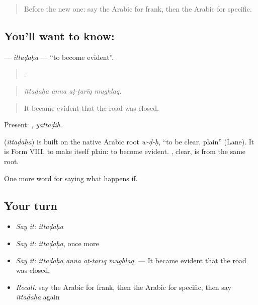 \label{lesson:AR-C417-ittadaha}



\begin{quote}
Before the new one: say the Arabic for frank, then the Arabic for specific.
\end{quote}

\subsection*{You'll want to know: }
\textbf{} — \emph{ittaḍaḥa} — \textquotedblleft{}to become evident\textquotedblright{}.

\begin{quote}
   .
\end{quote}

\begin{quote}
\emph{ittaḍaḥa anna aṭ-ṭarīq mughlaq.}
\end{quote}

\begin{quote}
It became evident that the road was closed.
\end{quote}

Present: , \emph{yattaḍiḥ}.

\begin{cousinweb}
\textbf{} (\emph{ittaḍaḥa}) is built on the native Arabic root \emph{w-ḍ-ḥ}, \textquotedblleft{}to be clear, plain\textquotedblright{} (Lane). It is Form VIII, to make itself plain: to become evident. , clear, is from the same root.
\end{cousinweb}

\begin{grammarlens}[title={What you've built}]
One more word for saying what happens if.
\end{grammarlens}

\subsection*{Your turn}
\begin{itemize}
\raggedright
  \item \emph{Say it:} \emph{ittaḍaḥa}
  \item \emph{Say it:} \emph{ittaḍaḥa}, once more
  \item \emph{Say it:} \emph{ittaḍaḥa anna aṭ-ṭarīq mughlaq.} — It became evident that the road was closed.
  \item \emph{Recall:} say the Arabic for frank, then the Arabic for specific, then say \emph{ittaḍaḥa} again
\end{itemize}

